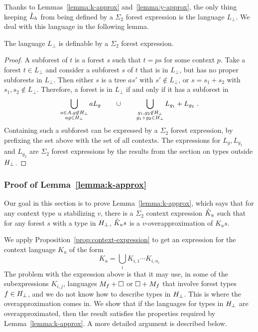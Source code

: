 \documentclass{LMCS}
\begin{document}
Thanks to Lemmas~\ref{lemma:k-approx} and~\ref{lemma:y-approx}, the
only thing keeping $\hat{L}_h $ from being defined by a $\Sigma_2$
forest expression is  the language $L_\bot$. We deal with this
language in the following lemma.

\begin{lem}
 The language  $L_\bot$   is definable by a
 $\Sigma_2$ forest expression.
\end{lem}
\begin{proof}
  A subforest of $t$ is a forest $s$ such that $t=ps$ for some context
  $p$.  Take a forest $t \in L_\bot$ and consider a subforest
  $s$ of $t$ that is in $L_\bot$, but has no proper subforests in
  $L_\bot$.  Then either $s$ is a tree $as'$ with $s' \not \in
  L_\bot$, or $s=s_1+s_2$ with $s_1,s_2 \not \in L_\bot$. Therefore, a
  forest is in $L_\bot$  if and only if it has a subforest in
  \[
\bigcup_{\substack{a \in A, g \not \in {H_\bot}\\ ag  \in {H_\bot}} }
     a L_g \qquad \cup \qquad \bigcup_{\substack{g_1,g_2 \not \in {H_\bot}\\ g_1 +g_2  \in {H_\bot}} }
      L_{g_1} + L_{g_2} \ .
  \]
  Containing such a subforest can be expressed by a $\Sigma_2$ forest
  expression, by prefixing the set above with the set of all contexts.
  The expressions for $L_g, L_{g_1}$ and $L_{g_2}$ are $\Sigma_2$
  forest expressions by the results from the section on types outside ${H_\bot}$.
\end{proof}

\subsubsection{Proof of Lemma~\ref{lemma:k-approx}}
\label{sec:proof-lemma-k}
Our goal in this section is to prove Lemma~\ref{lemma:k-approx}, which
says that for any context type $u$ stabilizing $v$, there is a
$\Sigma_2$ context expression $\hat{K}_u$ such that for any forest
$s$ with a type in ${H_\bot}$, $\hat{K}_us$ is a
$v$-overapproximation of $K_us$.

We apply Proposition~\ref{prop:context-expression} to get an
expression for the context language $K_u$ of the form
\begin{equation}
 \label{eq:ku-decomp}
 K_u = \bigcup_i K_{i,1} \cdots K_{i,n_i}
\end{equation} The problem with the expression above is that it may use,
in some of the subexpressions $K_{i,j}$, languages
$M_f + \Box$ or $\Box + M_f$  that involve  forest types $f \in {H_\bot}$, and we do not know
how to describe types in ${H_\bot}$. This is where the
overapproximation comes in. We show that if the languages for types in
${H_\bot}$ are overapproximated, then the result satisfies the
properties required by Lemma~\ref{lemma:k-approx}. A more detailed
argument is described below.
\end{document}
